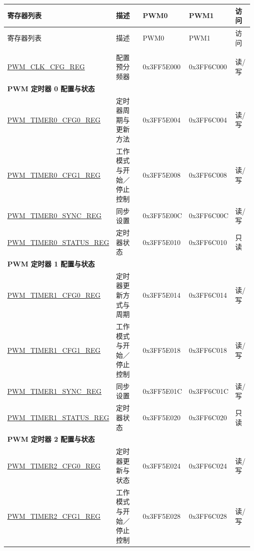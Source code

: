 
\begin{longtable}{ | p{5.3cm} | p{5.2cm} | p{2cm} | p{2cm} | p{1cm} | }
\hline\rowcolor{lightgray}
寄存器列表 & 描述 & PWM0 & PWM1 & 访问 \\ \hline

\endfirsthead
        \hline
        \rowcolor{lightgray}
     寄存器列表 & 描述 & PWM0 & PWM1 & 访问 \\
        \hline
        \endhead
        \endfoot

\multicolumn{5}{|l|}{\textbf{预分频器配置}} \\ \hline
\hyperref[regdesc:PWMCLKCFGREG]{PWM\_CLK\_CFG\_REG} &  配置预分频器 & 0x3FF5E000 & 0x3FF6C000 & 读/写 \\ \hline
\multicolumn{5}{|l|}{\textbf{PWM 定时器 0 配置与状态}} \\ \hline
\hyperref[regdesc:PWMTIMER0CFG0REG]{PWM\_TIMER0\_CFG0\_REG} & 定时器周期与更新方法 & 0x3FF5E004 & 0x3FF6C004 & 读/写 \\ \hline
\hyperref[regdesc:PWMTIMER0CFG1REG]{PWM\_TIMER0\_CFG1\_REG} & 工作模式与开始／停止控制 & 0x3FF5E008 & 0x3FF6C008 & 读/写 \\ \hline
\hyperref[regdesc:PWMTIMER0SYNCREG]{PWM\_TIMER0\_SYNC\_REG} & 同步设置 & 0x3FF5E00C & 0x3FF6C00C & 读/写 \\ \hline
\hyperref[regdesc:PWMTIMER0STATUSREG]{PWM\_TIMER0\_STATUS\_REG} & 定时器状态 & 0x3FF5E010 & 0x3FF6C010 & 只读 \\ \hline
\multicolumn{5}{|l|}{\textbf{PWM 定时器 1 配置与状态}} \\ \hline
\hyperref[regdesc:PWMTIMER1CFG0REG]{PWM\_TIMER1\_CFG0\_REG} & 定时器更新方式与周期 & 0x3FF5E014 & 0x3FF6C014 & 读/写 \\ \hline
\hyperref[regdesc:PWMTIMER1CFG1REG]{PWM\_TIMER1\_CFG1\_REG} & 工作模式与开始／停止控制 & 0x3FF5E018 & 0x3FF6C018 & 读/写 \\ \hline
\hyperref[regdesc:PWMTIMER1SYNCREG]{PWM\_TIMER1\_SYNC\_REG} & 同步设置 & 0x3FF5E01C & 0x3FF6C01C & 读/写 \\ \hline
\hyperref[regdesc:PWMTIMER1STATUSREG]{PWM\_TIMER1\_STATUS\_REG} & 定时器状态 & 0x3FF5E020 & 0x3FF6C020 & 只读 \\ \hline
\multicolumn{5}{|l|}{\textbf{PWM 定时器 2 配置与状态}} \\ \hline
\hyperref[regdesc:PWMTIMER2CFG0REG]{PWM\_TIMER2\_CFG0\_REG} & 定时器更新与状态 & 0x3FF5E024 & 0x3FF6C024 & 读/写 \\ \hline
\hyperref[regdesc:PWMTIMER2CFG1REG]{PWM\_TIMER2\_CFG1\_REG} & 工作模式与开始／停止控制 & 0x3FF5E028 & 0x3FF6C028 & 读/写 \\ \hline

\end{longtable}
